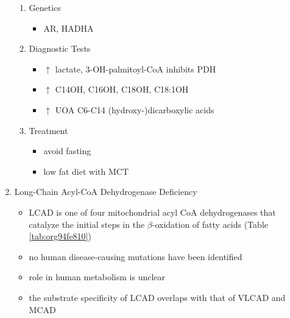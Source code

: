 \documentclass{scrartcl}
\begin{document}
\begin{enumerate}
\begin{enumerate}
\item Genetics
\label{sec:orgef9cf2f}
\begin{itemize}
\item AR, HADHA
\end{itemize}

\item Diagnostic Tests
\label{sec:orge1ebf2d}
\begin{itemize}
\item \(\uparrow\) lactate, 3-OH-palmitoyl-CoA inhibits PDH
\item \(\uparrow\) C14OH, C16OH, C18OH, C18:1OH
\item \(\uparrow\) UOA C6-C14 (hydroxy-)dicarboxylic acids
\end{itemize}

\item Treatment
\label{sec:orgf57c832}
\begin{itemize}
\item avoid fasting
\item low fat diet with MCT
\end{itemize}
\end{enumerate}
\item Long-Chain Acyl-CoA Dehydrogenase Deficiency
\label{sec:orgc93a67e}
\begin{itemize}
\item LCAD is one of four mitochondrial acyl CoA dehydrogenases that
catalyze the initial steps in the \(\beta\)-oxidation of fatty acids
(Table \ref{tab:org94fe810})
\item no human disease-causing mutations have been identified
\item role  in  human  metabolism  is unclear
\item the substrate specificity of LCAD overlaps with that of
VLCAD and MCAD
\end{itemize}


\end{enumerate}
\end{document}
